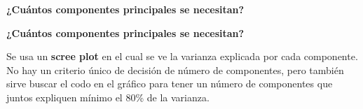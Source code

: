 \documentclass[10pt]{memoir}
\begin{document}
\clearpage
\begin{center}
	\textbf{\Large ¿Cuántos componentes principales se necesitan?} \\
\end{center}

\clearpage
\begin{center}
	\textbf{\Large ¿Cuántos componentes principales se necesitan?} \\
\end{center}
\noindent Se usa un \textbf{scree plot} en el cual se ve la varianza explicada por cada componente. No hay un criterio único de decisión de número de componentes, pero también sirve buscar el codo en el gráfico para tener un número de componentes que juntos expliquen mínimo el 80\% de la varianza.
\end{document}
